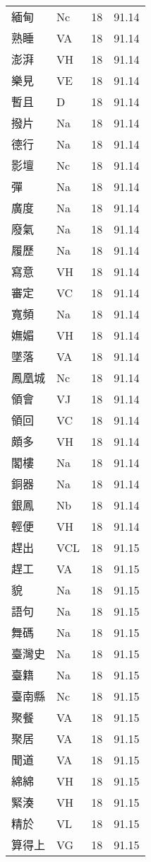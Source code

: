 \documentclass[twocolumn]{book}
\begin{document}
\begin{supertabular}{llrr}
緬甸 & Nc & 18 &  91.14\\
熟睡 & VA & 18 &  91.14\\
澎湃 & VH & 18 &  91.14\\
樂見 & VE & 18 &  91.14\\
暫且 & D & 18 &  91.14\\
撥片 & Na & 18 &  91.14\\
德行 & Na & 18 &  91.14\\
影壇 & Nc & 18 &  91.14\\
彈 & Na & 18 &  91.14\\
廣度 & Na & 18 &  91.14\\
廢氣 & Na & 18 &  91.14\\
履歷 & Na & 18 &  91.14\\
寫意 & VH & 18 &  91.14\\
審定 & VC & 18 &  91.14\\
寬頻 & Na & 18 &  91.14\\
嫵媚 & VH & 18 &  91.14\\
墜落 & VA & 18 &  91.14\\
鳳凰城 & Nc & 18 &  91.14\\
領會 & VJ & 18 &  91.14\\
領回 & VC & 18 &  91.14\\
頗多 & VH & 18 &  91.14\\
閣樓 & Na & 18 &  91.14\\
銅器 & Na & 18 &  91.14\\
銀鳳 & Nb & 18 &  91.14\\
輕便 & VH & 18 &  91.14\\
趕出 & VCL & 18 &  91.15\\
趕工 & VA & 18 &  91.15\\
貌 & Na & 18 &  91.15\\
語句 & Na & 18 &  91.15\\
舞碼 & Na & 18 &  91.15\\
臺灣史 & Na & 18 &  91.15\\
臺籍 & Na & 18 &  91.15\\
臺南縣 & Nc & 18 &  91.15\\
聚餐 & VA & 18 &  91.15\\
聚居 & VA & 18 &  91.15\\
聞道 & VA & 18 &  91.15\\
綿綿 & VH & 18 &  91.15\\
緊湊 & VH & 18 &  91.15\\
精於 & VL & 18 &  91.15\\
算得上 & VG & 18 &  91.15\\

\end{supertabular}
\end{document}
